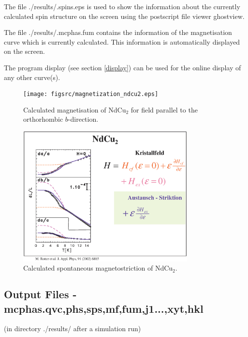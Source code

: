 The file {\prg ./results/.spins.eps} is used to show the information about the currently calculated
spin structure on the screen using the postscript file viewer ghostview.

The file {\prg ./results/.mcphas.fum} contains the information of the magnetisation curve
which is currently calculated. This information is automatically displayed on the screen.


The program {\prg display} (see section \ref{display}) can be used 
for the online display of any other
curve(s).

\begin{figure}[t]%
\begin{center}\leavevmode
\texttt{[image: figsrc/magnetization\_ndcu2.eps]}
\end{center}
\caption{Calculated magnetisation of NdCu$_2$ for field parallel to the orthorhombic $b$-direction.}
\label{magnetization}
\end{figure}

\begin{figure}[t]%
\begin{center}\leavevmode
\includegraphics[angle=0, width=0.8\textwidth]{figsrc/magnetostriction_ndcu2.eps}
\end{center}
\caption{Calculated spontaneous magnetostriction of NdCu$_2$.}
\label{magnetostrictiongraphic}
\end{figure}

\subsection{Output Files - {\prg mcphas.qvc,phs,sps,mf,fum,j1...,xyt,hkl} }\label{outputfiles}
 (in directory ./results/ after a simulation run) 


